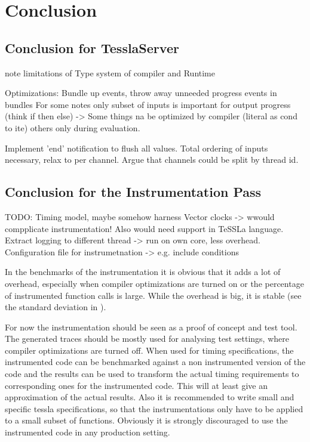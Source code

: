 %
\chapter{Conclusion}
\label{sec:conclusion}

\section{Conclusion for TesslaServer}

note limitations of Type system of compiler and Runtime

Optimizations: Bundle up events, throw away unneeded progress events in  bundles
  For some notes only subset of inputs is important for output progress (think if then else)
    -> Some things na be optimized by compiler (literal as cond to ite) others only during evaluation.

Implement 'end' notification to flush all values.
Total ordering of inputs necessary, relax to per channel. Argue that channels could be split by thread id.

\section{Conclusion for the Instrumentation Pass}
TODO: Timing model, maybe somehow harness Vector clocks -> wwould  compplicate instrumentation! Also would need support in TeSSLa language.
Extract logging to  different thread ->  run on own core, less overhead.
Configuration file for instrumetnation -> e.g. include conditions

In the benchmarks of the instrumentation it is obvious that it adds a lot of overhead, especially when compiler optimizations are turned on or the percentage of instrumented function calls is large.
While the overhead is big, it is stable (see the standard deviation in ).

For now the instrumentation should be seen as a proof of concept and test tool.
The generated traces should be mostly used for analysing test settings, where compiler optimizations are turned off.
When used for timing specifications, the instrumented code can be benchmarked against a non instrumented version of the code and the results can be used to transform the actual timing requirements to corresponding ones for the instrumented code.
This will at least give an approximation of the actual results.
Also it is recommended to write small and specific \gls{tessla} specifications, so that the instrumentations only have to be applied to a small subset of functions.
Obviously it is strongly discouraged to use the instrumented code in any production setting.

